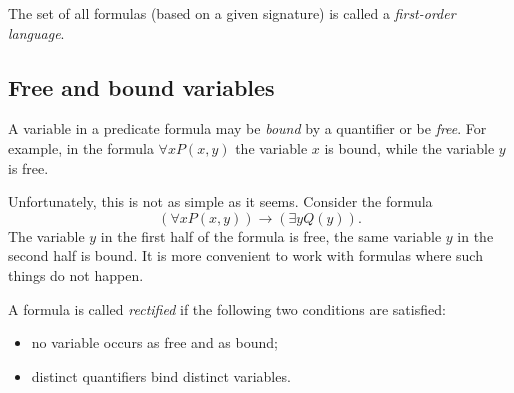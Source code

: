 \begin{page}
\setcounter{section}{1}
\setcounter{subsection}{1}
\setcounter{dfn}{4}
\label{portion:496}

\begin{dfn}
The set of all formulas (based on a given signature) is called a \emph{first-order language}.
\end{dfn}

\end{page}

\begin{page}
\setcounter{section}{1}
\setcounter{subsection}{2}
\setcounter{dfn}{4}
\label{portion:498}

\subsection{Free and bound variables}
A variable in a predicate formula may be \emph{bound} by a quantifier or be \emph{free}.
For example, in the formula $\forall x P(x,y)$ the variable $x$ is bound, while the variable $y$ is free.

Unfortunately, this is not as simple as it seems.
Consider the formula
\[
(\forall x P(x,y)) \to (\exists y Q(y)).
\]
The variable $y$ in the first half of the formula is free, the same variable $y$ in the second half is bound.
It is more convenient to work with formulas where such things do not happen.


\end{page}

\begin{page}
\setcounter{section}{1}
\setcounter{subsection}{2}
\setcounter{dfn}{5}
\label{portion:500}

\begin{dfn}
A formula is called \emph{rectified} if the following two conditions are satisfied:
\begin{itemize}
\item
no variable occurs as free and as bound;
\item
distinct quantifiers bind distinct variables.
\end{itemize}
\end{dfn}

\end{page}

